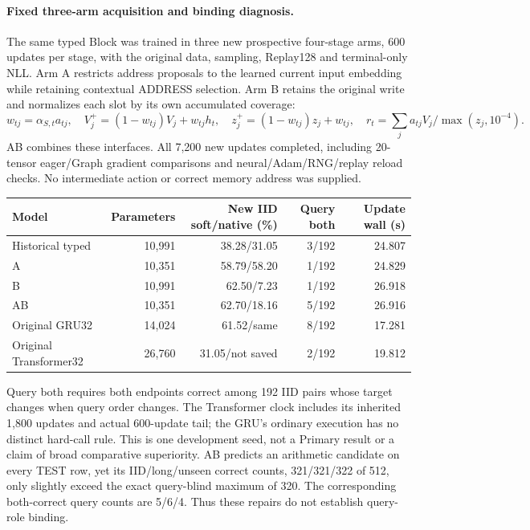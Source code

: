\paragraph{Fixed three-arm acquisition and binding diagnosis.}
The same typed Block was trained in three new prospective four-stage arms,
600 updates per stage, with the original data, sampling, Replay128 and
terminal-only NLL. Arm A restricts address proposals to the learned current
input embedding while retaining contextual ADDRESS selection. Arm B retains
the original write and normalizes each slot by its own accumulated coverage:
\begin{equation}
w_{tj}=\alpha_{S,t}a_{tj},\quad
V^+_j=(1-w_{tj})V_j+w_{tj}h_t,\quad
z^+_j=(1-w_{tj})z_j+w_{tj},\quad
r_t=\sum_j a_{tj}V_j/\max(z_j,10^{-4}).
\end{equation}
AB combines these interfaces. All 7,200 new updates completed, including
20-tensor eager/Graph gradient comparisons and neural/Adam/RNG/replay
reload checks. No intermediate action or correct memory address was supplied.
\begin{center}
\small
\begin{tabular}{lrrrr}
\hline
Model & Parameters & New IID soft/native (\%) & Query both & Update wall (s)\\
\hline
Historical typed & 10,991 & 38.28/31.05 & 3/192 & 24.807\\
A & 10,351 & 58.79/58.20 & 1/192 & 24.829\\
B & 10,991 & 62.50/7.23 & 1/192 & 26.918\\
AB & 10,351 & 62.70/18.16 & 5/192 & 26.916\\
Original GRU32 & 14,024 & 61.52/same & 8/192 & 17.281\\
Original Transformer32 & 26,760 & 31.05/not saved & 2/192 & 19.812\\
\hline
\end{tabular}
\end{center}
Query both requires both endpoints correct among 192 IID pairs whose target
changes when query order changes. The Transformer clock includes its
inherited 1,800 updates and actual 600-update tail; the GRU's ordinary
execution has no distinct hard-call rule. This is one development seed,
not a Primary result or a claim of broad comparative superiority.
AB predicts an arithmetic candidate on every TEST row, yet its
IID/long/unseen correct counts, 321/321/322 of 512, only slightly exceed
the exact query-blind maximum of 320. The corresponding both-correct query
counts are 5/6/4. Thus these repairs do not establish query-role binding.

